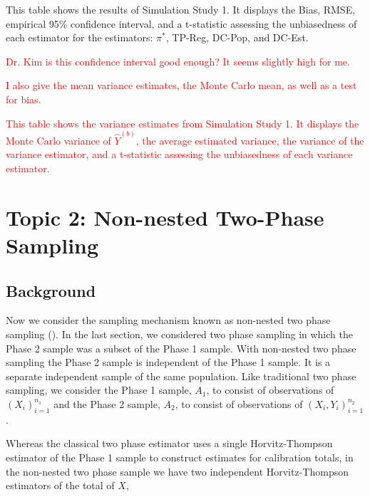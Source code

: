\documentclass[12pt]{article}
\begin{document}
\begin{table}[ht!]
  \centering

\caption{This table shows the results of Simulation Study 1. It displays the
Bias, RMSE, empirical 95\% confidence interval, and a t-statistic assessing the
unbiasedness of each estimator for the estimators: $\pi^*$, TP-Reg, DC-Pop, and
DC-Est.}
\label{tab:tpdc-mean}
\end{table}

\textcolor{red}{Dr. Kim is this confidence interval good enough? It seems
slightly high for me.}

\textcolor{red}{I also give the mean variance estimates, the Monte Carlo mean,
as well as a test for bias.}
\begin{table}[ht!]
  \centering
{\color{red}  }
\caption{\textcolor{red}{This table shows the variance estimates from Simulation
    Study 1. It displays the Monte Carlo variance of $\hat Y^{(b)}$, the average
    estimated variance, the variance of the variance estimator, and a
    t-statistic assessing the unbiasedness of each variance estimator.}}
\label{tab:tpdc-var}
\end{table}

\section{Topic 2: Non-nested Two-Phase Sampling}

\subsection{Background}

Now we consider the sampling mechanism known as non-nested two phase sampling 
(\cite{hidiroglou2001double}). In the last section, we considered two phase sampling
in which the Phase 2 sample was a subset of the Phase 1 sample. With non-nested
two phase sampling the Phase 2 sample is independent of the Phase 1 sample. It
is a separate independent sample of the same population. Like traditional two
phase sampling, we consider the Phase 1 sample, $A_1$, to consist of
observations of $(X_i)_{i = 1}^{n_1}$ and the Phase 2 sample, $A_2$, to consist
of observations of $(X_i, Y_i)_{i = 1}^{n_2}$. 

Whereas the classical two phase estimator uses a single Horvitz-Thompson
estimator of the Phase 1 sample to construct estimates for calibration totals,
in the non-nested two phase sample we have two independent Horvitz-Thompson
estimators of the total of $X$,
\end{document}

